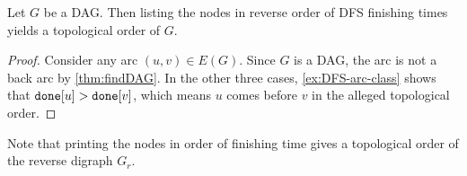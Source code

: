 \begin{Theorem}
Let $G$ be a DAG. Then listing the nodes in reverse order of DFS
finishing times yields a topological order of $G$.
\end{Theorem}
\begin{proof} 
Consider any arc $(u,v)\in E(G)$. Since $G$ is a DAG,
the arc is not a back arc by \cref{thm:findDAG}. In the other three
cases, \cref{ex:DFS-arc-class} shows that $\done[u] > \done[v]$,
which means $u$ comes before $v$ in the alleged topological order.
\end{proof}

Note that printing the nodes in order of
finishing time gives a topological order of the reverse digraph $G_r$.

%
%
%
%
%
%
%
%
%
%

